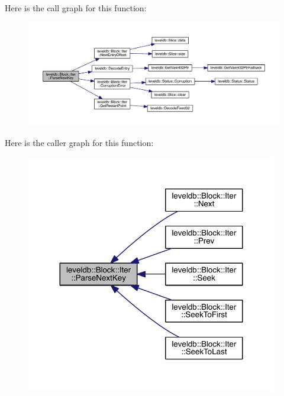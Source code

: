 Here is the call graph for this function\+:\nopagebreak
\begin{figure}[H]
\begin{center}
\leavevmode
\includegraphics[width=350pt]{classleveldb_1_1_block_1_1_iter_abb8c89f7256e79148d942ddbc4351775_cgraph}
\end{center}
\end{figure}




Here is the caller graph for this function\+:\nopagebreak
\begin{figure}[H]
\begin{center}
\leavevmode
\includegraphics[width=311pt]{classleveldb_1_1_block_1_1_iter_abb8c89f7256e79148d942ddbc4351775_icgraph}
\end{center}
\end{figure}


\hypertarget{classleveldb_1_1_block_1_1_iter_a096747ff77d5090579fe4cd4e464a3c9}{}
